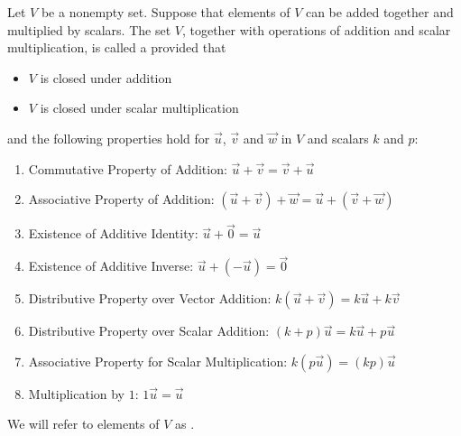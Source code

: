 \documentclass{ximera}
\begin{document}
  \begin{definition}\label{def:vectorspacegeneral} 
  Let $V$ be a nonempty set.  Suppose that elements of $V$ can be added together and multiplied by scalars.  The set $V$, together with operations of addition and scalar multiplication, is called a  provided that 
  \begin{itemize}
  \item[] $V$ is closed under addition
  \item[] $V$ is closed under scalar multiplication
  \end{itemize}
  and the following properties hold for $\vec{u}$, $\vec{v}$ and $\vec{w}$ in $V$ and scalars $k$ and $p$:
  \begin{enumerate}
   \item \label{item:commaddvectspdef}
  Commutative Property of Addition:\quad
  $\vec{u}+\vec{v}=\vec{v}+\vec{u}$
  \item \label{item:assaddvectspdef}
  Associative Property of Addition:\quad
  $(\vec{u}+\vec{v})+\vec{w}=\vec{u}+(\vec{v}+\vec{w})$
  \item \label{item:idaddvectspdef}
  Existence of Additive Identity:\quad
  $\vec{u}+\vec{0}=\vec{u}$
  \item \label{item:invaddvectspdef}
  Existence of Additive Inverse:\quad
  $\vec{u}+(-\vec{u})=\vec{0}$
  \item \label{item:distvectaddvectspdef}
  Distributive Property over Vector Addition:\quad
  $k(\vec{u}+\vec{v})=k\vec{u}+k\vec{v}$
  \item \label{item:distscalaraddvectspdef}
  Distributive Property over Scalar Addition:\quad
  $(k+p)\vec{u}=k\vec{u}+p\vec{u}$
  \item \label{item:assmultvectspdef}
  Associative Property for Scalar Multiplication:\quad
  $k(p\vec{u})=(kp)\vec{u}$
  \item \label{item:idmultvectspdef}
  Multiplication by $1$:\quad
  $1\vec{u}=\vec{u}$
  \end{enumerate}
We will refer to elements of $V$ as .  
\end{definition}
\end{document}
